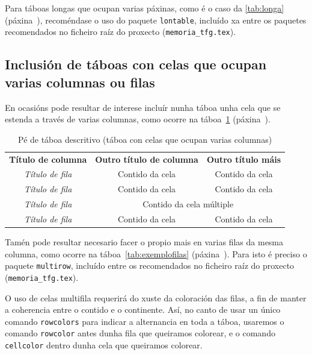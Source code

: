 Para táboas longas que ocupan varias páxinas, como é o caso da \ref{tab:longa}
(páxina~\pageref{tab:longa}), recoméndase o uso do paquete \texttt{lontable},
incluído xa entre os paquetes recomendados no ficheiro raíz do proxecto
(\verb+memoria_tfg.tex+).



\subsection{Inclusión de táboas con celas que ocupan varias columnas ou filas}

En ocasións pode resultar de interese incluír nunha táboa unha cela que se estenda
a través de varias columnas, como ocorre na táboa~\ref{tab:exemplocolumnas}
(páxina~\pageref{tab:exemplocolumnas}).

\begin{table}[hp!]
  \centering
  \begin{tabular}{c|c|c}
  \rowcolor{udcpink!25}
  \multicolumn{3}{c}{\textbf{Cela en varias columnas}} \\\hline
  \rowcolor{udcpink!25}
  \textbf{Título de columna} & \textbf{Outro título de columna} & \textbf{Outro título máis} \\\hline
  \textit{Título de fila}    & Contido da cela                  & Contido da cela \\
  \textit{Título de fila}    & Contido da cela                  & Contido da cela \\
  \textit{Título de fila}    & \multicolumn{2}{c}{Contido da cela múltiple} \\
  \textit{Título de fila}    & Contido da cela                  & Contido da cela \\
  \end{tabular}
  \caption{Pé de táboa descritivo (táboa con celas que ocupan varias columnas)}
  \label{tab:exemplocolumnas}
\end{table}

Tamén pode resultar necesario facer o propio mais en varias filas da mesma columna,
como ocorre na táboa~\ref{tab:exemplofilas} (páxina~\pageref{tab:exemplofilas}).
Para isto é preciso o paquete \texttt{multirow}, incluído entre os recomendados no
ficheiro raíz do proxecto (\verb+memoria_tfg.tex+).

O uso de celas multifila requerirá do xuste da coloración das filas, a fin de manter
a coherencia entre o contido e o continente. Así, no canto de usar un único comando
\verb+rowcolors+ para indicar a alternancia en toda a táboa, usaremos o comando
\verb+rowcolor+ antes dunha fila que queiramos colorear, e o comando \verb+cellcolor+
dentro dunha cela que queiramos colorear.

